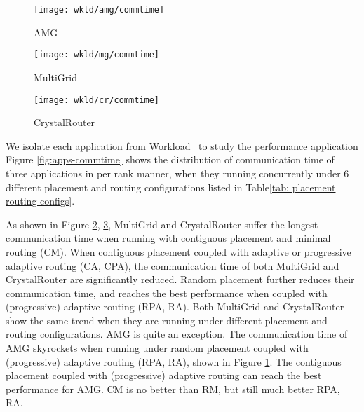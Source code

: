 \begin{figure*}[t!]
    \centering
    \begin{subfigure}[t]{0.32\textwidth}
        \centering
        \texttt{[image: wkld/amg/commtime]}
        \caption{AMG}
        \label{fig:amg-commtime}
    \end{subfigure}%
    \hspace{1em}%
    \begin{subfigure}[t]{0.32\textwidth}
        \centering
        \texttt{[image: wkld/mg/commtime]}
        \caption{MultiGrid}
        \label{fig:mg-commtime}
    \end{subfigure}%
    \begin{subfigure}[t]{0.32\textwidth}
        \centering
        \texttt{[image: wkld/cr/commtime]}
        \caption{CrystalRouter}
        \label{fig:cr-commtime}
    \end{subfigure}%
   \caption{The communication time of all ranks in each application. Random placement and adaptive routing can improve the communication time of MultiGrid and CrystalRouter, while AMG's communication time is greatly prolonged.}
   \label{fig:apps-commtime}
\end{figure*}
We isolate each application from Workload~ to study the performance application
Figure \ref{fig:apps-commtime} shows the distribution of communication time of three applications in per rank manner, when they running concurrently under 6 different placement and routing configurations listed in Table\ref{tab: placement routing configs}.

As shown in Figure \ref{fig:mg-commtime}, \ref{fig:cr-commtime}, MultiGrid and CrystalRouter suffer the longest communication time when running with contiguous placement and minimal routing (CM). When contiguous placement coupled with adaptive or progressive adaptive routing (CA, CPA), the communication time of both MultiGrid and CrystalRouter are significantly reduced. Random placement further reduces their communication time, and reaches the best performance when coupled with (progressive) adaptive routing (RPA, RA). Both MultiGrid and CrystalRouter show the same trend when they are running under different placement and routing configurations. AMG is quite an exception. The communication time of AMG skyrockets when running under random placement coupled with (progressive) adaptive routing (RPA, RA), shown in Figure \ref{fig:amg-commtime}. The contiguous placement coupled with (progressive) adaptive routing can reach the best performance for AMG. CM is no better than RM, but still much better RPA, RA. 



